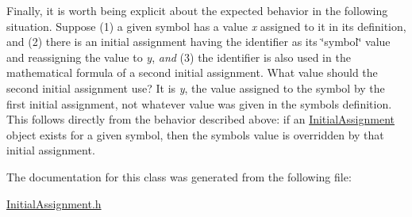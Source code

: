 Finally, it is worth being explicit about the expected behavior in the following situation. Suppose (1) a given symbol has a value {\itshape x} assigned to it in its definition, and (2) there is an initial assignment having the identifier as its \char`\"{}symbol\char`\"{} value and reassigning the value to {\itshape y}, {\itshape and} (3) the identifier is also used in the mathematical formula of a second initial assignment. What value should the second initial assignment use? It is {\itshape y}, the value assigned to the symbol by the first initial assignment, not whatever value was given in the symbol\textquotesingle{}s definition. This follows directly from the behavior described above\+: if an \hyperlink{class_initial_assignment}{Initial\+Assignment} object exists for a given symbol, then the symbol\textquotesingle{}s value is overridden by that initial assignment. 

The documentation for this class was generated from the following file\+:\begin{DoxyCompactItemize}
\item 
\hyperlink{_initial_assignment_8h}{Initial\+Assignment.\+h}\end{DoxyCompactItemize}

